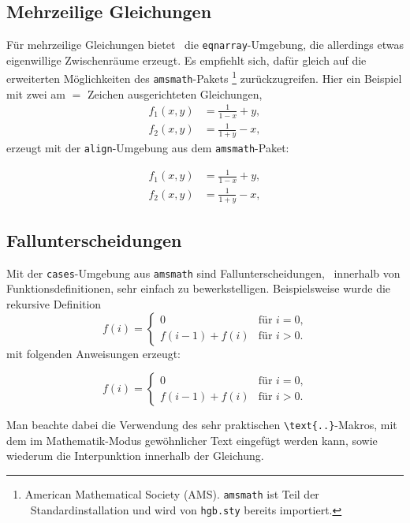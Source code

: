 \subsection{Mehrzeilige Gleichungen}

Für mehrzeilige Gleichungen bietet \latex\ die \verb!eqnarray!-Umgebung, die
allerdings etwas eigenwillige Zwischenräume erzeugt. Es empfiehlt sich, dafür
gleich auf die erweiterten Möglichkeiten des \texttt{amsmath}-Pakets%
\footnote{American Mathematical Society (AMS). \texttt{amsmath} ist Teil der
\latex\ Standardinstallation und wird von \texttt{hgb.sty} bereits importiert.}
\cite{Mittelbach2022} zurückzugreifen. Hier ein Beispiel mit zwei am $=$
Zeichen ausgerichteten Gleichungen,
%
\begin{align}
	f_1 (x,y) &= \frac{1}{1-x} + y , \label{eq:f1} \\
	f_2 (x,y) &= \frac{1}{1+y} - x , \label{eq:f2}
\end{align}
%
erzeugt mit der \texttt{align}-Umgebung aus dem \texttt{amsmath}-Paket:
%
\begin{LaTeXCode}[numbers=none]
\begin{align}
  f_1 (x,y) &= \frac{1}{1-x} + y , \label{eq:f1} \\
  f_2 (x,y) &= \frac{1}{1+y} - x , \label{eq:f2}
\end{align}
\end{LaTeXCode}


\subsection{Fallunterscheidungen}

Mit der \texttt{cases}-Umgebung aus \texttt{amsmath} sind Fallunterscheidungen,
\ua\ innerhalb von Funktionsdefinitionen, sehr einfach zu bewerkstelligen.
Beispielsweise wurde die rekursive Definition
%
\begin{equation}
	f(i) =
	\begin{cases}
		0             & \text{für $i = 0$,}\\
		f(i-1) + f(i) & \text{für $i > 0$.}
	\end{cases}
\end{equation}%
%
mit folgenden Anweisungen erzeugt:
%
\begin{LaTeXCode}[numbers=none]
\begin{equation}
	f(i) =
	\begin{cases}
	  0             & \text{für $i = 0$,}\\
	  f(i-1) + f(i) & \text{für $i > 0$.}
	\end{cases}
\end{equation}
\end{LaTeXCode}
%
Man beachte dabei die Verwendung des sehr praktischen \verb!\text{..}!-Makros,
mit dem im Mathematik-Modus gewöhnlicher Text eingefügt werden kann, sowie
wiederum die Interpunktion innerhalb der Gleichung.


